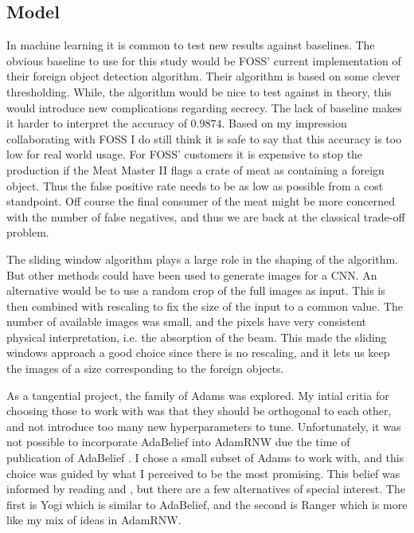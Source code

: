 \subsection{Model}
\label{sec:dismodel}
In machine learning it is common to test new results against baselines.
The obvious baseline to use for this study would be FOSS' current implementation of their foreign object detection algorithm.
Their algorithm is based on some clever thresholding.
While, the algorithm would be nice to test against in theory, this would introduce new complications regarding secrecy.
The lack of baseline makes it harder to interpret the accuracy of $0.9874$.
Based on my impression collaborating with FOSS I do still think it is safe to say that this accuracy is too low for real world usage.
For FOSS' customers it is expensive to stop the production if the Meat Master II flags a crate of meat as containing a foreign object. 
Thus the false positive rate needs to be as low as possible from a cost standpoint.
Off course the final consumer of the meat might be more concerned with the number of false negatives, and thus we are back at the classical trade-off problem.

The sliding window algorithm plays a large role in the shaping of the algorithm.
But other methods could have been used to generate images for a \ac{CNN}. 
An alternative would be to use a random crop of the full images as input.
This is then combined with rescaling to fix the size of the input to a common value.
The number of available images was small, and the pixels have very consistent physical interpretation, i.e. the absorption of the beam.
This made the sliding windows approach a good choice since there is no rescaling, and it lets us keep the images of a size corresponding to the foreign objects.

As a tangential project, the 
family of \acp{Adam} was explored.
My intial critia for choosing those to work with was that they should be orthogonal to each other, and not introduce too many new hyperparameters to tune.
Unfortunately, it was not possible to incorporate AdaBelief into AdamRNW due the time of publication of AdaBelief \cite{zhuangAdaBeliefOptimizerAdapting2020}.
I chose a small subset of \acp{Adam} to work with, and this choice was guided by what I perceived to be the most promising.
This belief was informed by reading \cite{zhuangAdaBeliefOptimizerAdapting2020} and \cite{luoAdaptiveGradientMethods2018}, but there are a few alternatives of special interest.
The first is Yogi \cite{zaheerAdaptiveMethodsNonconvex2018} which is similar to AdaBelief, and the second is Ranger \cite{wrightLessw2020RangerDeepLearningOptimizer2020} which is more like my mix of ideas in AdamRNW.  

